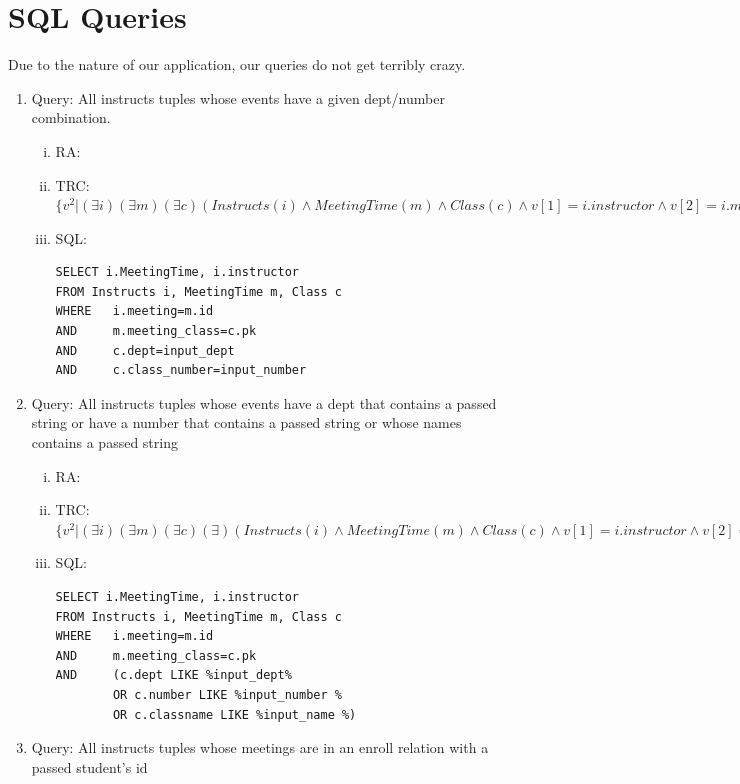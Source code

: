 \documentclass[pdftex,12pt,letter]{article}
\begin{document}
\section{SQL Queries}
Due to the nature of our application, our queries do not get terribly crazy.
\begin{enumerate}[1.]
\item Query: All instructs tuples whose events have a given dept/number combination.
\begin{enumerate}[i.]
\item RA: 
\item TRC: $\{v^2\vert(\exists i)(\exists m)(\exists c)(Instructs(i) \wedge MeetingTime(m) \wedge Class(c) \wedge v[1]=i.instructor \wedge v[2]=i.meeting \wedge i.meeting=m.id \wedge m.meeting\_class = c.pk \wedge c.dept=input\_dept \wedge c.class\_number = input\_number)\}$
\item SQL: 
\begin{verbatim}
SELECT i.MeetingTime, i.instructor
FROM Instructs i, MeetingTime m, Class c
WHERE 	i.meeting=m.id
AND		m.meeting_class=c.pk
AND		c.dept=input_dept
AND		c.class_number=input_number
\end{verbatim}
\end{enumerate}
\item Query: All instructs tuples whose events have a dept that contains a passed string or have a number that contains a passed string or whose names contains a
passed string
\begin{enumerate}[i.]
\item RA:
\item TRC:$\{v^2\vert(\exists i)(\exists m)(\exists c)(\exists)(Instructs(i) \wedge MeetingTime(m) \wedge Class(c) \wedge v[1]=i.instructor \wedge v[2]=i.meeting \wedge i.meeting=m.id \wedge m.meeting\_class = c.pk \wedge (Contains(c.dept, input\_dept) \vee Contains(c.number, input\_number) \vee Contains(c.classname, input\_name)))\}$
\item SQL:
\begin{verbatim}
SELECT i.MeetingTime, i.instructor
FROM Instructs i, MeetingTime m, Class c
WHERE 	i.meeting=m.id
AND		m.meeting_class=c.pk
AND		(c.dept LIKE %input_dept%
	 	OR c.number LIKE %input_number %
	 	OR c.classname LIKE %input_name %)
\end{verbatim}
\end{enumerate}
\item Query: All instructs tuples whose meetings are in an enroll relation with a
passed student's id
\begin{enumerate}[i.]

\end{enumerate}
\end{enumerate}
\end{document}
